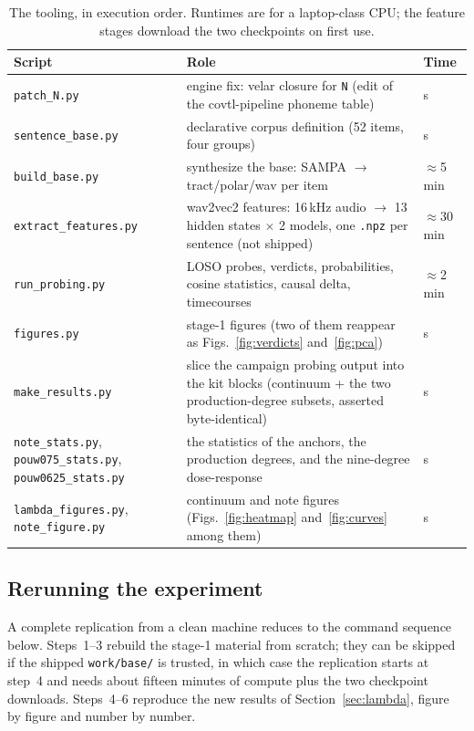 \documentclass[11pt,a4paper]{article}
\newcommand{\sampa}[1]{\texttt{#1}}
\begin{document}
\begin{table}[htbp]
\centering
\footnotesize
\caption{The tooling, in execution order. Runtimes are for a
laptop-class CPU; the feature stages download the two checkpoints on
first use.}
\label{tab:scripts}
\begin{tabularx}{\textwidth}{@{}l X l@{}}
\toprule
Script & Role & Time \\
\midrule
\sampa{patch\_N.py} & engine fix: velar closure for \sampa{N} (edit of
the covtl-pipeline phoneme table) & s \\
\sampa{sentence\_base.py} & declarative corpus definition (52 items,
four groups) & s \\
\sampa{build\_base.py} & synthesize the base: SAMPA $\to$
tract/polar/wav per item & $\approx$5\,min \\
\sampa{extract\_features.py} & wav2vec2 features: 16\,kHz audio $\to$
13 hidden states $\times$ 2 models, one \sampa{.npz} per sentence (not
shipped) & $\approx$30\,min \\
\sampa{run\_probing.py} & LOSO probes, verdicts, probabilities,
cosine statistics, causal delta, timecourses & $\approx$2\,min \\
\sampa{figures.py} & stage-1 figures (two of them reappear as
Figs.~\ref{fig:verdicts} and~\ref{fig:pca}) & s \\
\sampa{make\_results.py} & slice the campaign probing output into the
kit blocks (continuum + the two production-degree subsets, asserted
byte-identical) & s \\
\sampa{note\_stats.py}, \sampa{pouw075\_stats.py},
\sampa{pouw0625\_stats.py} & the statistics of the anchors, the
production degrees, and the nine-degree dose-response & s \\
\sampa{lambda\_figures.py}, \sampa{note\_figure.py} & continuum and
note figures (Figs.~\ref{fig:heatmap} and~\ref{fig:curves} among
them) & s \\
\bottomrule
\end{tabularx}
\end{table}

\subsection{Rerunning the experiment}

A complete replication from a clean machine reduces to the command
sequence below. Steps~1--3 rebuild the stage-1 material from scratch;
they can be skipped if the shipped \sampa{work/base/} is trusted, in
which case the replication starts at step~4 and needs about fifteen
minutes of compute plus the two checkpoint downloads. Steps~4--6
reproduce the new results of Section~\ref{sec:lambda}, figure by
figure and number by number.
\end{document}
